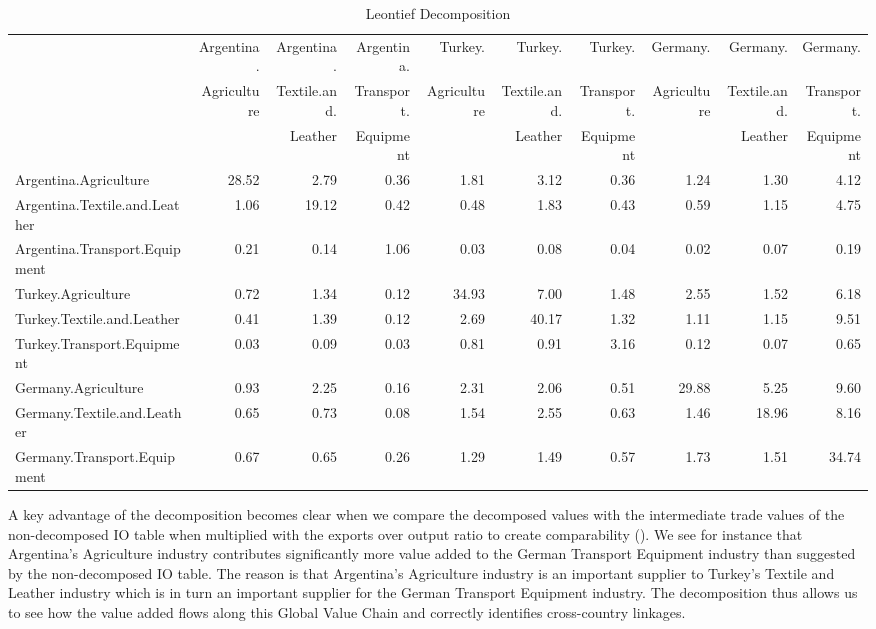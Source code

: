 \documentclass[a4paper,11pt]{article}
\begin{document}
\begin{sidewaystable}
  \caption{Leontief Decomposition}
  \label{tab:leon}
  \begin{tabular}{lrrrrrrrrr}
    \hline
          & Argentina. & Argentina. & Argentina. & Turkey. & Turkey. & Turkey. & Germany. & Germany. & Germany.\\
          & Agriculture & Textile.and. & Transport. & Agriculture & Textile.and. & Transport. & Agriculture & Textile.and. & Transport.\\
          & & Leather & Equipment & & Leather & Equipment & & Leather & Equipment\\
    \hline
    Argentina.Agriculture & 28.52 & 2.79  & 0.36  & 1.81  & 3.12  & 0.36  & 1.24  & 1.30  & 4.12 \\
    Argentina.Textile.and.Leather & 1.06  & 19.12 & 0.42  & 0.48  & 1.83  & 0.43  & 0.59  & 1.15  & 4.75 \\
    Argentina.Transport.Equipment & 0.21  & 0.14  & 1.06  & 0.03  & 0.08  & 0.04  & 0.02  & 0.07  & 0.19 \\
    Turkey.Agriculture & 0.72  & 1.34  & 0.12  & 34.93 & 7.00  & 1.48  & 2.55  & 1.52  & 6.18 \\
    Turkey.Textile.and.Leather & 0.41  & 1.39  & 0.12  & 2.69  & 40.17 & 1.32  & 1.11  & 1.15  & 9.51 \\
    Turkey.Transport.Equipment & 0.03  & 0.09  & 0.03  & 0.81  & 0.91  & 3.16  & 0.12  & 0.07  & 0.65 \\
    Germany.Agriculture & 0.93  & 2.25  & 0.16  & 2.31  & 2.06  & 0.51  & 29.88 & 5.25  & 9.60 \\
    Germany.Textile.and.Leather & 0.65  & 0.73  & 0.08  & 1.54  & 2.55  & 0.63  & 1.46  & 18.96 & 8.16 \\
    Germany.Transport.Equipment & 0.67  & 0.65  & 0.26  & 1.29  & 1.49  & 0.57  & 1.73  & 1.51  & 34.74 \\
    \hline
    \end{tabular}
\end{sidewaystable}


A key advantage of the decomposition becomes clear when we compare the decomposed values with the intermediate trade values of the non-decomposed IO table when multiplied with the exports over output ratio to create comparability ().
We see for instance that Argentina's Agriculture industry contributes significantly more value added to the German Transport Equipment industry than suggested by the non-decomposed IO table. The reason is that Argentina's Agriculture industry is an important supplier to Turkey's Textile and Leather industry which is in turn an important supplier for the German Transport Equipment industry. The decomposition thus allows us to see how the value added flows along this Global Value Chain and correctly identifies cross-country linkages.
\end{document}
